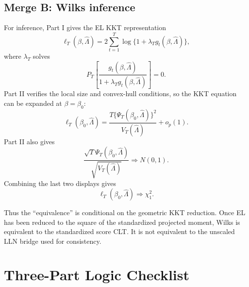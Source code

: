 \documentclass[12pt]{article}
\numberwithin{equation}{section}
\theoremstyle{definition}
\newcommand{\op}{o_p}
\begin{document}
\subsection{Merge B: Wilks inference}

For inference, Part I gives the EL KKT representation
\[
    \ell_T(\beta,\widehat\Lambda)
    =2\sum_{t=1}^T\log\{1+\lambda_Tg_t(\beta,\widehat\Lambda)\},
\]
where \(\lambda_T\) solves
\[
    P_T\left[\frac{g_t(\beta,\widehat\Lambda)}
    {1+\lambda_Tg_t(\beta,\widehat\Lambda)}\right]=0.
\]
Part II verifies the local size and convex-hull conditions, so the KKT equation
can be expanded at \(\beta=\beta_0\):
\[
    \ell_T(\beta_0,\widehat\Lambda)
    =\frac{T\{\Psi_T(\beta_0,\widehat\Lambda)\}^2}
           {V_T(\widehat\Lambda)}+\op(1).
\]
Part II also gives
\[
    \frac{\sqrt T\Psi_T(\beta_0,\widehat\Lambda)}
         {\sqrt{V_T(\widehat\Lambda)}}
    \Rightarrow N(0,1).
\]
Combining the last two displays gives
\begin{equation}
    \ell_T(\beta_0,\widehat\Lambda)
    \Rightarrow \chi_1^2.
    \label{eq:target-wilks}
\end{equation}

Thus the ``equivalence'' is conditional on the geometric KKT reduction. Once
EL has been reduced to the square of the standardized projected moment, Wilks is
equivalent to the standardized score CLT. It is not equivalent to the unscaled
LLN bridge used for consistency.

\begin{center}
\end{center}

\section{Three-Part Logic Checklist}
\end{document}
